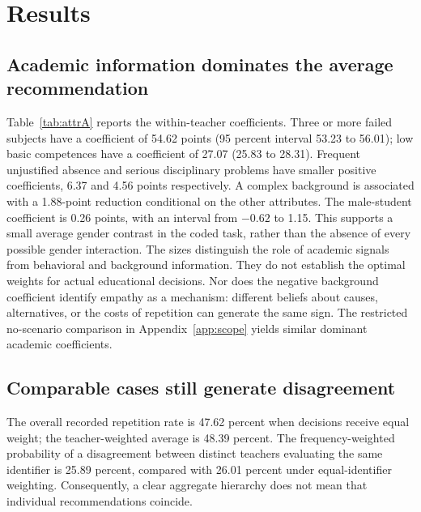 \section{Results}
\subsection{Academic information dominates the average recommendation}
Table~\ref{tab:attrA} reports the within-teacher coefficients. Three or more failed subjects have a coefficient of 54.62 points (95 percent interval 53.23 to 56.01); low basic competences have a coefficient of 27.07 (25.83 to 28.31). Frequent unjustified absence and serious disciplinary problems have smaller positive coefficients, 6.37 and 4.56 points respectively. A complex background is associated with a 1.88-point reduction conditional on the other attributes. The male-student coefficient is 0.26 points, with an interval from $-0.62$ to 1.15. This supports a small average gender contrast in the coded task, rather than the absence of every possible gender interaction.
The sizes distinguish the role of academic signals from behavioral and background information. They do not establish the optimal weights for actual educational decisions. Nor does the negative background coefficient identify empathy as a mechanism: different beliefs about causes, alternatives, or the costs of repetition can generate the same sign. The restricted no-scenario comparison in Appendix~\ref{app:scope} yields similar dominant academic coefficients.

\subsection{Comparable cases still generate disagreement}
The overall recorded repetition rate is 47.62 percent when decisions receive equal weight; the teacher-weighted average is 48.39 percent. The frequency-weighted probability of a disagreement between distinct teachers evaluating the same identifier is 25.89 percent, compared with 26.01 percent under equal-identifier weighting. Consequently, a clear aggregate hierarchy does not mean that individual recommendations coincide.

